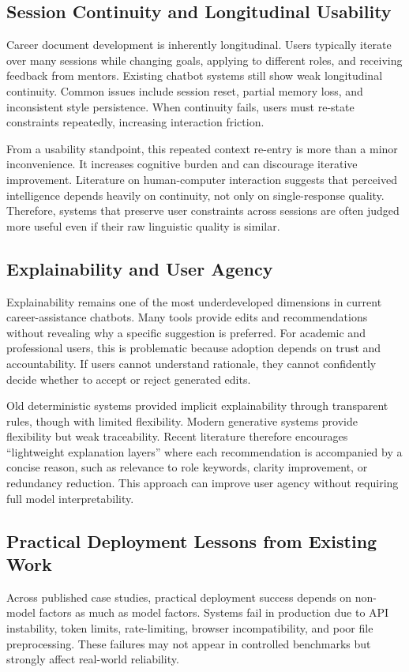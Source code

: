 \documentclass[conference]{IEEEtran}
\begin{document}
\subsection{Session Continuity and Longitudinal Usability}
Career document development is inherently longitudinal. Users typically iterate over many sessions while changing goals, applying to different roles, and receiving feedback from mentors. Existing chatbot systems still show weak longitudinal continuity. Common issues include session reset, partial memory loss, and inconsistent style persistence. When continuity fails, users must re-state constraints repeatedly, increasing interaction friction.

From a usability standpoint, this repeated context re-entry is more than a minor inconvenience. It increases cognitive burden and can discourage iterative improvement. Literature on human-computer interaction suggests that perceived intelligence depends heavily on continuity, not only on single-response quality. Therefore, systems that preserve user constraints across sessions are often judged more useful even if their raw linguistic quality is similar.

\subsection{Explainability and User Agency}
Explainability remains one of the most underdeveloped dimensions in current career-assistance chatbots. Many tools provide edits and recommendations without revealing why a specific suggestion is preferred. For academic and professional users, this is problematic because adoption depends on trust and accountability. If users cannot understand rationale, they cannot confidently decide whether to accept or reject generated edits.

Old deterministic systems provided implicit explainability through transparent rules, though with limited flexibility. Modern generative systems provide flexibility but weak traceability. Recent literature therefore encourages ``lightweight explanation layers'' where each recommendation is accompanied by a concise reason, such as relevance to role keywords, clarity improvement, or redundancy reduction. This approach can improve user agency without requiring full model interpretability.

\subsection{Practical Deployment Lessons from Existing Work}
Across published case studies, practical deployment success depends on non-model factors as much as model factors. Systems fail in production due to API instability, token limits, rate-limiting, browser incompatibility, and poor file preprocessing. These failures may not appear in controlled benchmarks but strongly affect real-world reliability.
\end{document}
